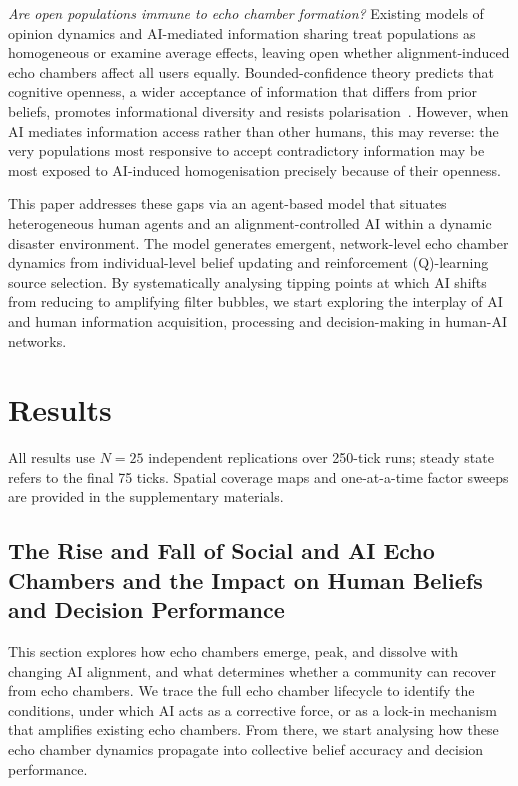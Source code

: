 \documentclass[pdflatex,sn-apa]{sn-jnl}%
\begin{document}
\textit{Are open populations immune to echo chamber formation?} Existing models of opinion dynamics and AI-mediated information sharing treat populations as homogeneous or examine average effects, leaving open whether alignment-induced echo chambers affect all users equally. Bounded-confidence theory predicts that cognitive openness, a wider acceptance of information that differs from prior beliefs, promotes informational diversity and resists polarisation~\citep{Hegselmann2002}. However, when AI mediates information access rather than other humans, this may reverse: the very populations most responsive to accept contradictory information may be most exposed to AI-induced homogenisation precisely because of their openness.

This paper addresses these gaps via an agent-based model that situates heterogeneous human  agents and an alignment-controlled AI within a dynamic disaster environment. The model generates emergent, network-level echo chamber dynamics from 
individual-level belief updating and reinforcement (Q)-learning source selection. By  systematically analysing tipping points at which AI shifts from reducing to amplifying filter bubbles, we start exploring the interplay of AI and human information acquisition, processing and decision-making in human-AI networks. 

\section{Results}
\label{sec:results}
 
All results use $N = 25$ independent replications over 250-tick runs; steady state refers to the final 75 ticks. Spatial coverage maps and one-at-a-time factor sweeps are provided in the supplementary materials.

\subsection{The Rise and Fall of Social and AI Echo Chambers
and the Impact on Human Beliefs and Decision Performance}
\label{sec:dynamics}

This section explores how echo chambers emerge, peak, and dissolve with changing AI alignment, and what determines whether a community can recover from echo chambers. We trace the full echo chamber lifecycle to identify the conditions, under which AI acts as a corrective force, or as a lock-in mechanism that amplifies existing echo chambers. From there, we start analysing how these echo chamber dynamics propagate into collective belief accuracy and decision performance.
\end{document}
